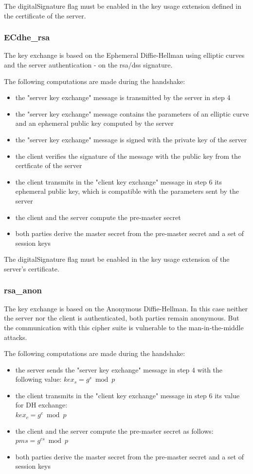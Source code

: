 The digitalSignature flag must be enabled in the key usage extension defined in the certificate of the server.

\subsubsection*{EC\gls{dhe}\_\gls{rsa}}
The key exchange is based on the Ephemeral Diffie-Hellman using elliptic curves and the server authentication - on the \gls{rsa}/\gls{dss} signature.

The following computations are made during the handshake:
\begin{itemize}
	\item the "server key exchange" message is transmitted by the server in step 4 
	\item the "server key exchange" message contains the parameters of an elliptic curve and an ephemeral public key computed by the server
	\item the "server key exchange" message is signed with the private key of the server
	\item the client verifies the signature of the message with the public key from the certficate of the server
	\item the client transmits in the "client key exchange" message in step 6 its ephemeral public key, which is compatible with the parameters sent by the server
	\item the client and the server compute the pre-master secret
	\item both parties derive the master secret from the pre-master secret and a set of session keys
\end{itemize}

The digitalSignature flag must be enabled in the key usage extension of the server's certificate.

\subsubsection*{\gls{rsa}\_anon}
The key exchange is based on the Anonymous Diffie-Hellman. In this case neither the server nor the client is authenticated, both parties remain anonymous. But the communication with this cipher suite is vulnerable to the man-in-the-middle attacks.

The following computations are made during the handshake:
\begin{itemize}
	\item the server sends the "server key exchange" message in step 4 with the following value: $\displaystyle kex_s = g^s \bmod p $ 
	\item the client transmits in the "client key exchange" message in step 6 its value for DH exchange: \\ $\displaystyle kex_c = g^c \bmod p $ 
	\item the client and the server compute the pre-master secret as follows: $\displaystyle pms = g^{cs} \bmod p$
	\item both parties derive the master secret from the pre-master secret and a set of session keys
\end{itemize}

